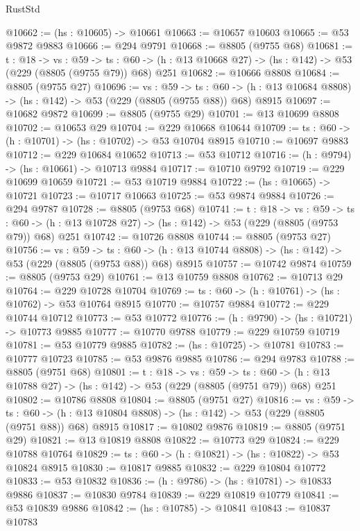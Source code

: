 \begin{lexlean}{RustStd}
\begin{coremodule}
@10662 := (hs : @10605) -> @10661
@10663 := @10657 @10603
@10665 := @53 @9872 @9883
@10666 := @294 @9791
@10668 := @8805 (@9755 @68)
@10681 := {t : @18} ->
  {vs : @59} ->
  {ts : @60} -> (h : @13 @10668 @27) -> (hs : @142) -> @53 (@229 (@8805 (@9755 @79)) @68) @251
@10682 := @10666 @8808
@10684 := @8805 (@9755 @27)
@10696 := {vs : @59} ->
  {ts : @60} -> (h : @13 @10684 @8808) -> (hs : @142) -> @53 (@229 (@8805 (@9755 @88)) @68) @8915
@10697 := @10682 @9872
@10699 := @8805 (@9755 @29)
@10701 := @13 @10699 @8808
@10702 := @10653 @29
@10704 := @229 @10668 @10644
@10709 := {ts : @60} -> (h : @10701) -> (hs : @10702) -> @53 @10704 @8915
@10710 := @10697 @9883
@10712 := @229 @10684 @10652
@10713 := @53 @10712
@10716 := (h : @9794) -> (hs : @10661) -> @10713 @9884
@10717 := @10710 @9792
@10719 := @229 @10699 @10659
@10721 := @53 @10719 @9884
@10722 := (hs : @10665) -> @10721
@10723 := @10717 @10663
@10725 := @53 @9874 @9884
@10726 := @294 @9787
@10728 := @8805 (@9753 @68)
@10741 := {t : @18} ->
  {vs : @59} ->
  {ts : @60} -> (h : @13 @10728 @27) -> (hs : @142) -> @53 (@229 (@8805 (@9753 @79)) @68) @251
@10742 := @10726 @8808
@10744 := @8805 (@9753 @27)
@10756 := {vs : @59} ->
  {ts : @60} -> (h : @13 @10744 @8808) -> (hs : @142) -> @53 (@229 (@8805 (@9753 @88)) @68) @8915
@10757 := @10742 @9874
@10759 := @8805 (@9753 @29)
@10761 := @13 @10759 @8808
@10762 := @10713 @29
@10764 := @229 @10728 @10704
@10769 := {ts : @60} -> (h : @10761) -> (hs : @10762) -> @53 @10764 @8915
@10770 := @10757 @9884
@10772 := @229 @10744 @10712
@10773 := @53 @10772
@10776 := (h : @9790) -> (hs : @10721) -> @10773 @9885
@10777 := @10770 @9788
@10779 := @229 @10759 @10719
@10781 := @53 @10779 @9885
@10782 := (hs : @10725) -> @10781
@10783 := @10777 @10723
@10785 := @53 @9876 @9885
@10786 := @294 @9783
@10788 := @8805 (@9751 @68)
@10801 := {t : @18} ->
  {vs : @59} ->
  {ts : @60} -> (h : @13 @10788 @27) -> (hs : @142) -> @53 (@229 (@8805 (@9751 @79)) @68) @251
@10802 := @10786 @8808
@10804 := @8805 (@9751 @27)
@10816 := {vs : @59} ->
  {ts : @60} -> (h : @13 @10804 @8808) -> (hs : @142) -> @53 (@229 (@8805 (@9751 @88)) @68) @8915
@10817 := @10802 @9876
@10819 := @8805 (@9751 @29)
@10821 := @13 @10819 @8808
@10822 := @10773 @29
@10824 := @229 @10788 @10764
@10829 := {ts : @60} -> (h : @10821) -> (hs : @10822) -> @53 @10824 @8915
@10830 := @10817 @9885
@10832 := @229 @10804 @10772
@10833 := @53 @10832
@10836 := (h : @9786) -> (hs : @10781) -> @10833 @9886
@10837 := @10830 @9784
@10839 := @229 @10819 @10779
@10841 := @53 @10839 @9886
@10842 := (hs : @10785) -> @10841
@10843 := @10837 @10783

\end{coremodule}
\end{lexlean}
